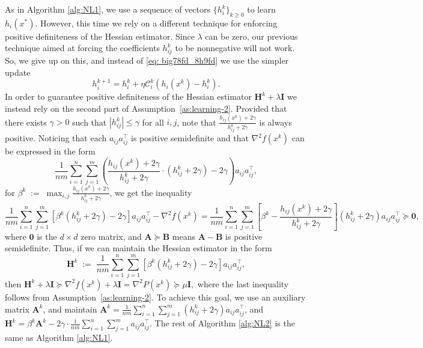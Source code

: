 \documentclass[10pt]{article}
\newcommand{\squeeze}{}
\newcommand{\eqdef}{\; { := }\;}
\newcommand{\newalpha}{h}
\newcommand{\mA}{\mathbf{A}}
\newcommand{\mB}{\mathbf{B}}
\newcommand{\mH}{\mathbf{H}}
\newcommand{\mI}{\mathbf{I}}
\newcommand{\cC}{{\mathcal{C}}}
\begin{document}
As in Algorithm \ref{alg:NL1}, we use a sequence of vectors $\{h_i^k\}_{k\geq 0}$ to learn $\newalpha_i(x^*)$. However, this 
time we rely on a different technique for enforcing positive definiteness of the Hessian estimator.  Since $\lambda$ can be zero, our previous technique aimed at forcing the coefficients $h_{ij}^k$ to be nonnegative will not work. So, we give up on this, 
and instead of \eqref{eq: big78fd_8h9fd} we use the simpler update 
\begin{equation}\label{eq:hikgeneral}
\boxed{\quad h^{k+1}_i = h^k_i + \eta \cC_i^k(\newalpha_i(x^k) - h^k_i). \quad}
\end{equation}
In order to guarantee positive definiteness of  the Hessian estimator $\mH^k + \lambda \mI$ we instead rely on the second part of Assumption~\ref{as:learning-2}. Provided that there exists $\gamma>0$ such that $|h_{ij}^k| \leq \gamma$ for all $i,j$, note that $\frac{\newalpha_{ij}(x^k) + 2\gamma}{h_{ij}^k + 2\gamma}$ is always positive. Noticing that each $a_{ij}a_{ij}^\top$ is positive semidefinite and that $\nabla^2 f(x^k)$ can be expressed in the form
$$
\squeeze \frac{1}{nm}\sum \limits_{i=1}^n \sum\limits_{j=1}^m \left( \frac{\newalpha_{ij}(x^k) + 2\gamma}{h_{ij}^k + 2\gamma} \cdot (h_{ij}^k + 2\gamma) - 2\gamma \right) a_{ij}a_{ij}^\top, 
$$
for  $\beta^k \eqdef \max_{i,j} \frac{\newalpha_{ij}(x^k) + 2\gamma}{h_{ij}^k + 2\gamma}$, we get the inequality
$$
 \frac{1}{nm}\sum_{i=1}^n \sum_{j=1}^m \left[ \beta^k (h_{ij}^k + 2\gamma) - 2\gamma \right] a_{ij}a_{ij}^\top - \nabla^2 f(x^k) 
= \frac{1}{nm}\sum_{i=1}^n \sum_{j=1}^m \left[  \beta^k - \frac{\newalpha_{ij}(x^k) + 2\gamma}{h_{ij}^k + 2\gamma} \right] (h_{ij}^k + 2\gamma) a_{ij}a_{ij}^\top 
\succeq \mathbf{0},
$$
where $\mathbf{0}$ is the $d\times d$ zero matrix, and $\mA \succeq \mB$ means $\mA - \mB$ is positive semidefinite. Thus, if we can maintain the Hessian estimator in the form $$\squeeze \mH^k \eqdef \frac{1}{nm}\sum \limits_{i=1}^n \sum \limits_{j=1}^m \left[ \beta^k (h_{ij}^k + 2\gamma) - 2\gamma \right] a_{ij}a_{ij}^\top,$$ then 
$
\mH^k + \lambda \mI \succeq \nabla^2 f(x^k) + \lambda \mI = \nabla^2P(x^k) \succeq \mu \mI,
$
where the last inequality follows from Assumption~\ref{as:learning-2}. To achieve this goal, we use an auxiliary matrix $\mA^k$, and maintain $\mA^k = \frac{1}{nm} \sum_{i=1}^n \sum_{j=1}^{m}(h_{ij}^k + 2\gamma) a_{ij}a_{ij}^\top$, and $\mH^k = \beta^k \mA^k - 2\gamma \cdot\frac{1}{nm} \sum_{i=1}^n  \sum_{j=1}^{m}a_{ij}a_{ij}^\top$. The rest of Algorithm \ref{alg:NL2} is the same as Algorithm \ref{alg:NL1}. 
\end{document}
